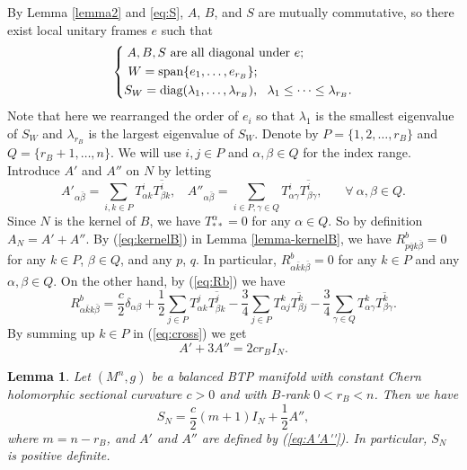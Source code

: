 \documentclass{amsart}
\newtheorem{lemma}{Lemma}
\begin{document}
By Lemma \ref{lemma2}  and \eqref{eq:S}, $A$, $B$, and  $S$ are
mutually commutative, so there exist local unitary frames $e$ such that
  \begin{equation} \label{eq:e}
\left\{ \begin{aligned} A, B, S \ \mbox{are all diagonal under} \ e; \hspace{1.35cm}\\
W = \mbox{span}\{ e_1, \ldots , e_{r_B}\}; \hspace{2.65cm}\\
S_W=\mbox{diag}(\lambda_1,\ldots , \lambda_{r_B}), \ \ \lambda_1\leq \cdots \leq \lambda_{r_B}. \end{aligned}
\right.
\end{equation}
Note that here we rearranged the order of $e_i$ so that $\lambda_1$ is the smallest eigenvalue of $S_W$ and $\lambda_{r_B}$ is the largest eigenvalue of $S_W$. Denote by $P=\{ 1, 2, \ldots , r_B\}$ and $Q=\{ r_B\!+\!1, \ldots , n\}$. We will use $i,j\in P$ and $\alpha , \beta \in Q$ for the index range. Introduce $A'$ and $A''$ on $N$ by letting
\begin{equation} \label{eq:A'A''}
 A'_{\alpha \bar{\beta}} = \sum_{i,k\in P}T^i_{\alpha k} \overline{ T^i_{\beta k}} , \ \ \ \ A''_{\alpha \bar{\beta}} = \sum_{i\in P, \gamma \in Q}T^i_{\alpha \gamma} \overline{ T^i_{\beta \gamma}} , \ \ \ \ \ \ \ \ \forall \ \alpha , \beta \in Q.
 \end{equation}
Since $N$ is the kernel of $B$, we have $T^{\alpha}_{\ast \ast}=0$ for any $\alpha \in Q$. So by definition $A_N=A'+A''$. By (\ref{eq:kernelB}) in Lemma \ref{lemma-kernelB}, we have $R^b_{p\bar{q}k\bar{\beta}}=0$ for any $k\in P$,  $\beta \in Q$, and any $p$, $q$. In particular, $R^b_{\alpha\bar{k}k\bar{\beta}}=0$ for any $k\in P$ and any  $\alpha ,\beta \in Q$. On the other hand, by (\ref{eq:Rb}) we have
\begin{equation} \label{eq:cross}
 R^b_{\alpha\bar{k}k\bar{\beta}} = \frac{c}{2}\delta_{\alpha \beta} +\frac{1}{2} \sum_{j\in P} T^j_{\alpha k} \overline{ T^j_{\beta k} } -\frac{3}{4} \sum_{j\in P} T^k_{\alpha j} \overline{ T^k_{\beta j} }  -\frac{3}{4} \sum_{\gamma \in Q} T^k_{\alpha \gamma } \overline{ T^k_{\beta \gamma } }.
\end{equation}
By summing up $k\in P$ in (\ref{eq:cross}) we get
\begin{equation}  \label{eq:A'+A''}
A' + 3A'' = 2cr_B I_N.
\end{equation}

\begin{lemma} \label{lemma-min}
Let $(M^n,g)$ be a balanced BTP manifold with constant Chern holomorphic sectional curvature $c>0$ and with $B$-rank $0<r_B<n$. Then we have
\begin{equation}  \label{eq:SN}
S_N = \frac{c}{2}(m+1)I_N + \frac{1}{2}A'',
\end{equation}
where $m=n-r_B$, and $A'$ and $A''$ are defined by (\ref{eq:A'A''}). In particular, $S_N $ is positive definite.
\end{lemma}
\end{document}
